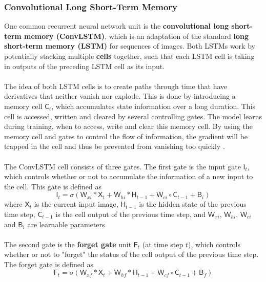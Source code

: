 \documentclass[./main.tex]{subfiles}
\begin{document}
\subsubsection{Convolutional Long Short-Term Memory}
One common recurrent neural network unit is the \textbf{convolutional long short-term memory (ConvLSTM)}, which is an adaptation of the standard \textbf{long short-term memory (LSTM)} for sequences of images. Both LSTMs work by potentially stacking multiple \textbf{cells} together, such that each LSTM cell is taking in outputs of the preceding LSTM cell as its input. 
\\
\\
\noindent The idea of both LSTM cells is to create paths through time that have derivatives that neither vanish nor explode. This is done by introducing a memory cell $\mathsf{C}_t$, which accumulates state information over a long duration. This cell is accessed, written and cleared by several controlling gates. The model learns during training, when to access, write and clear this memory cell. By using the memory cell and gates to control the flow of information, the gradient will be trapped in the cell and thus be prevented from vanishing too quickly \cite{DL_book,conv_lstm}.
\\
\\
The ConvLSTM cell consists of three gates. The first gate is the input gate $\mathsf{I}_t$, which controls whether or not to accumulate the information of a new input to the cell. This gate is defined as
\begin{equation}
    \mathsf{I}_t = \sigma \left( \mathsf{W}_{xi} * \mathsf{X}_t + \mathsf{W}_{hi} * \mathsf{H}_{t - 1} + \mathsf{W}_{ci} \circ \mathsf{C}_{t - 1} + \mathsf{B}_i \right)
\end{equation}
where $\mathsf{X}_t$ is the current input image, $\mathsf{H}_{t - 1}$ is the hidden state of the previous time step, $\mathsf{C}_{t - 1}$ is the cell output of the previous time step, and $\mathsf{W}_{xi}$, $\mathsf{W}_{hi}$, $\mathsf{W}_{ci}$ and $\mathsf{B}_i$ are learnable parameters
\\
\\
The second gate is the \textbf{forget gate} unit $\mathsf{F}_t$ (at time step $t$), which controls whether or not to "forget" the status of the cell output of the previous time step. The forget gate is defined as
\begin{equation}
    \mathsf{F}_t = \sigma \left( \mathsf{W}_{xf} * \mathsf{X}_t + \mathsf{W}_{hf} * \mathsf{H}_{t - 1} + \mathsf{W}_{cf} \circ \mathsf{C}_{t - 1} + \mathsf{B}_f \right)
\end{equation}
\end{document}
